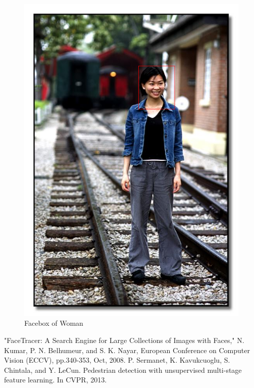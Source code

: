 \documentclass[letterpaper,10pt, twocolumn]{article}
\begin{document}
\begin{figure}
  \centering
    \includegraphics[scale=0.3]{intro-graphics/facerect}
  \caption{Facebox of Woman \cite{FaceTracer}}
  \label{fig:facebox}
\end{figure}







\begin{thebibliography}{9}
	"FaceTracer: A Search Engine for Large Collections of Images with Faces," 
	N. Kumar, P. N. Belhumeur, and S. K. Nayar, 
	European Conference on Computer Vision (ECCV), 
	pp.340-353, Oct, 2008.
	P. Sermanet, K. Kavukcuoglu, S. Chintala, and Y. LeCun. Pedestrian
	detection with unsupervised multi-stage feature learning. In CVPR,
	2013.


\end{thebibliography}
\end{document}
